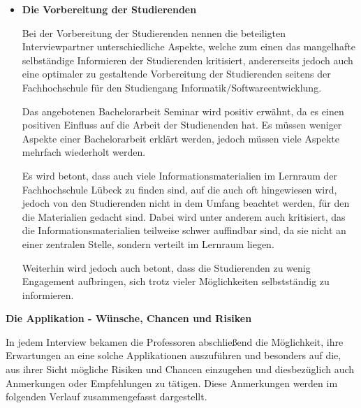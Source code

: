 \documentclass{scrreprt}
\begin{document}
\begin{itemize}
\item \textbf{Die Vorbereitung der Studierenden}
\par Bei der Vorbereitung der Studierenden nennen die beteiligten Interviewpartner unterschiedliche Aspekte, welche zum einen das mangelhafte selbständige Informieren der Studierenden kritisiert, andererseits jedoch auch eine optimaler zu gestaltende Vorbereitung der Studierenden seitens der Fachhochschule für den Studiengang Informatik/Softwareentwicklung.
\par Das angebotenen Bachelorarbeit Seminar wird positiv erwähnt, da es einen positiven Einfluss auf die Arbeit der Studienenden hat. Es müssen weniger Aspekte einer Bachelorarbeit erklärt werden, jedoch müssen viele Aspekte mehrfach wiederholt werden. 
\par Es wird betont, dass auch viele Informationsmaterialien im Lernraum der Fachhochschule Lübeck zu finden sind, auf die auch oft hingewiesen wird, jedoch von den Studierenden nicht in dem Umfang beachtet werden, für den die Materialien gedacht sind. Dabei wird unter anderem auch kritisiert, das die Informationsmaterialien teilweise schwer auffindbar sind, da sie nicht an einer zentralen Stelle, sondern verteilt im Lernraum liegen. 
\par Weiterhin wird jedoch auch betont, dass die Studierenden zu wenig Engagement aufbringen, sich trotz vieler Möglichkeiten selbstständig zu informieren. 
\end{itemize}

\textbf{Die Applikation - Wünsche, Chancen und Risiken}
\par In jedem Interview bekamen die Professoren abschließend die Möglichkeit, ihre Erwartungen an eine solche Applikationen auszuführen und besonders auf die, aus ihrer Sicht mögliche Risiken und Chancen einzugehen und diesbezüglich auch Anmerkungen oder Empfehlungen zu tätigen. Diese Anmerkungen werden im folgenden Verlauf zusammengefasst dargestellt.\\
\end{document}

